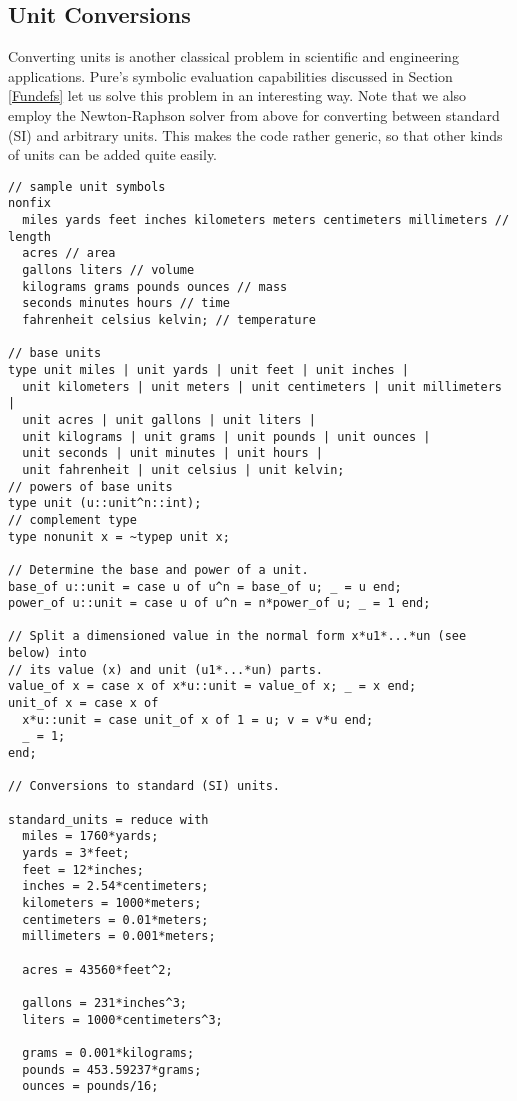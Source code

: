 \documentclass[a4paper,12pt]{article}
\begin{document}
\subsection{Unit Conversions}
\label{Units}

Converting units is another classical problem in scientific and engineering
applications. Pure's symbolic evaluation capabilities discussed in Section
\ref{Fundefs} let us solve this problem in an interesting way. Note that we
also employ the Newton-Raphson solver from above for converting between
standard (SI) and arbitrary units. This makes the code rather generic, so that
other kinds of units can be added quite easily.

\begin{lstlisting}
// sample unit symbols
nonfix
  miles yards feet inches kilometers meters centimeters millimeters // length
  acres // area
  gallons liters // volume
  kilograms grams pounds ounces // mass
  seconds minutes hours // time
  fahrenheit celsius kelvin; // temperature

// base units
type unit miles | unit yards | unit feet | unit inches |
  unit kilometers | unit meters | unit centimeters | unit millimeters |
  unit acres | unit gallons | unit liters |
  unit kilograms | unit grams | unit pounds | unit ounces |
  unit seconds | unit minutes | unit hours |
  unit fahrenheit | unit celsius | unit kelvin;
// powers of base units
type unit (u::unit^n::int);
// complement type
type nonunit x = ~typep unit x;

// Determine the base and power of a unit.
base_of u::unit = case u of u^n = base_of u; _ = u end;
power_of u::unit = case u of u^n = n*power_of u; _ = 1 end;

// Split a dimensioned value in the normal form x*u1*...*un (see below) into
// its value (x) and unit (u1*...*un) parts.
value_of x = case x of x*u::unit = value_of x; _ = x end;
unit_of x = case x of
  x*u::unit = case unit_of x of 1 = u; v = v*u end;
  _ = 1;
end;

// Conversions to standard (SI) units.

standard_units = reduce with
  miles = 1760*yards;
  yards = 3*feet;
  feet = 12*inches;
  inches = 2.54*centimeters;
  kilometers = 1000*meters;
  centimeters = 0.01*meters;
  millimeters = 0.001*meters;

  acres = 43560*feet^2;

  gallons = 231*inches^3;
  liters = 1000*centimeters^3;

  grams = 0.001*kilograms;
  pounds = 453.59237*grams;
  ounces = pounds/16;


\end{lstlisting}
\end{document}
